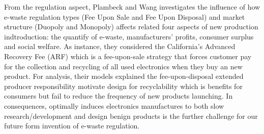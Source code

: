 From the regulation aspect, Plambeck and Wang  \cite{plambeck2009}  investigates the influence of how e-waste regulation types (Fee Upon Sale and Fee Upon Disposal) and market structure (Duopoly and Monopoly) affects related four aspects of new production indtroduction: the quantify of e-waste, manufacturers' profits, consumer surplus and social welfare. 
As instance, they considered the California's Advanced Recovery Fee (ARF) which is a fee-upon-sale strategy that forces customer pay for the collection and recycling of all used electronics when they buy an new product. For analysis, their models explained the fee-upon-disposal extended producer responsibility motivate design for recyclability which is benefits for consumers but fail to reduce the frequency of new products launching.
In consequences, optimally induces electronics manufactures to both slow research/development and design benign products is the further challenge for our future form invention of e-waste regulation.